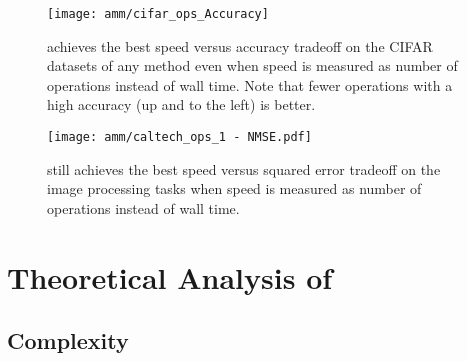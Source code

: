 \begin{figure}[h]
\begin{center}
\texttt{[image: amm/cifar\_ops\_Accuracy]}
\caption{\oursp achieves the best speed versus accuracy tradeoff on the CIFAR datasets of any method even when speed is measured as number of operations instead of wall time. Note that fewer operations with a high accuracy (up and to the left) is better.}
\label{fig:cifarOps}
\end{center}
\end{figure}

\begin{figure}[h]
\begin{center}
\texttt{[image: amm/caltech\_ops\_1 - NMSE.pdf]}
\caption{\oursp still achieves the best speed versus squared error tradeoff on the image processing tasks when speed is measured as number of operations instead of wall time.}
\label{fig:caltechOps}
\end{center}
\end{figure}

\clearpage
\section{Theoretical Analysis of \ours} \label{sec:maddnessMath}


\subsection{Complexity}


